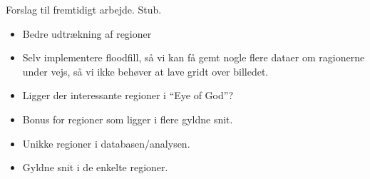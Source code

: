 {
{\sffamily Forslag til fremtidigt arbejde. Stub.
}

\begin{itemize}
    \item Bedre udtrækning af regioner
    \item Selv implementere floodfill, så vi kan få gemt nogle flere
    dataer om ragionerne under vejs, så vi ikke behøver at lave gridt
    over billedet.
    \item Ligger der interessante regioner i ``Eye of God''?
    \item Bonus for regioner som ligger i flere gyldne snit.
    \item Unikke regioner i databasen/analysen.
    \item Gyldne snit i de enkelte regioner.
\end{itemize}

%
}

